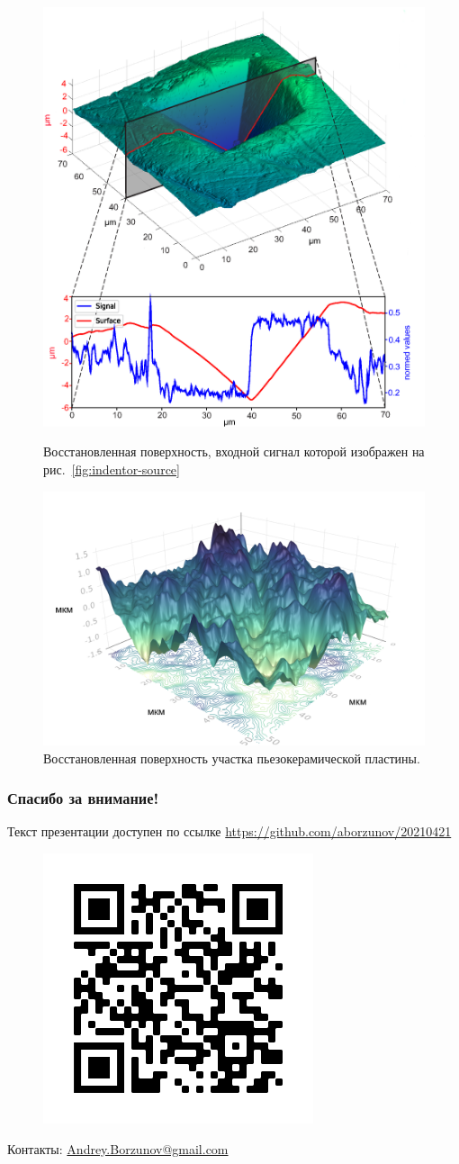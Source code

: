 \documentclass{beamer}
\begin{document}
\begin{frame}[c,allowframebreaks]
\framebreak

    \begin{figure}
        \includegraphics[width=0.45\linewidth]{indentor.eps}
        \caption{Восстановленная поверхность, входной сигнал которой изображен на
        рис.~\ref{fig:indentor-source}}
        {\label{fig:indentor}}%
    \end{figure}

\framebreak

    \begin{figure}[ht]
        \includegraphics[width=0.55\linewidth]{PZT.png}
        \caption{Восстановленная поверхность участка пьезокерамической пластины.}
    \end{figure}


\end{frame}

\begin{frame}[c,allowframebreaks]
    
\end{frame}

\begin{frame}[c]
    \frametitle{Спасибо за внимание!}
    Текст презентации доступен по ссылке
    \url{https://github.com/aborzunov/20210421}
    \begin{figure}
        \includegraphics[width=0.5\linewidth]{repo_link.png}
    \end{figure}
     Контакты: \url{Andrey.Borzunov@gmail.com}
\end{frame}
\end{document}

